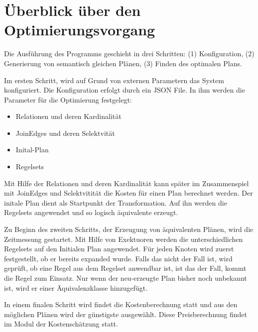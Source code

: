 \section{Überblick über den Optimierungsvorgang}
Die Ausführung des Programms geschieht in drei Schritten: (1) Konfiguration, (2) Generierung von semantisch gleichen Plänen, (3) Finden des optimalen Plans.

Im ersten Schritt, wird auf Grund von externen Parametern das System konfiguriert. Die Konfiguration erfolgt durch ein JSON File. In ihm werden die Parameter für die Optimierung festgelegt:

\begin{itemize}
\item Relationen und deren Kardinalität 
\item JoinEdges und deren Selektvität
\item Inital-Plan
\item Regelsets
\end{itemize}

Mit Hilfe der Relationen und deren Kardinalität kann später im Zusammenspiel mit JoinEdges und Selektvitität die Kosten für einen Plan berechnet werden. Der initale Plan dient als Startpunkt der Transformation. Auf ihn werden die Regelsets angewendet und so logisch äquivalente erzeugt.

Zu Beginn des zweiten Schritts, der Erzeugung von äquivalenten Plänen, wird die Zeitmessung gestartet.  Mit Hilfe von Exektuoren werden die unterschiedlichen Regelsets auf den Initialen Plan angewendet. Für jeden Knoten wird zuerst festgestellt, ob er bereits expanded wurde. Falls das nicht der Fall ist, wird geprüft, ob eine Regel aus dem Regelset anwendbar ist, ist das der Fall, kommt die Regel zum Einsatz. Nur wenn der neu-erzeugte Plan bisher noch unbekannt ist, wird er einer Äquivalenzklasse hinzugefügt.

In einem finalen Schritt wird findet die Kostenberechnung statt und aus den möglichen Plänen wird der günstigste ausgewählt. Diese Preisberechnung findet im Modul der Kostenschätzung statt.



